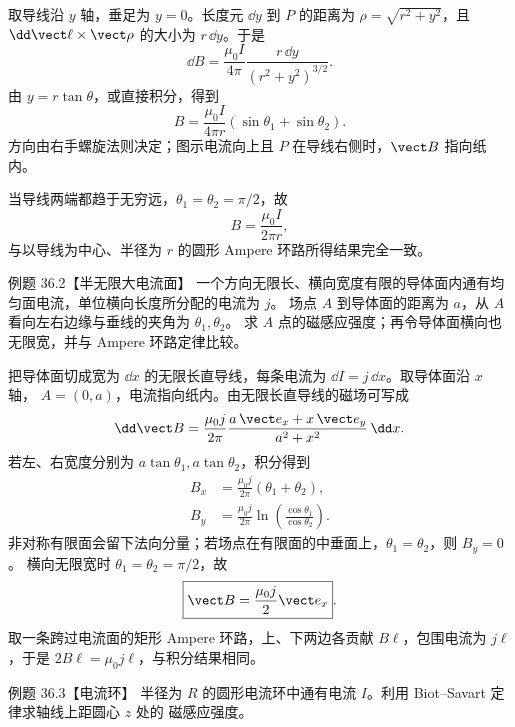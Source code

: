 \begin{xesolution}
取导线沿 $y$ 轴，垂足为 $y=0$。长度元 $\dd y$ 到 $P$ 的距离为
$\rho=\sqrt{r^2+y^2}$，且 $\dd\vect\ell\times\vect\rho$ 的大小为 $r\,\dd y$。于是
\[
  \dd B=\frac{\mu_0I}{4\pi}\frac{r\,\dd y}{(r^2+y^2)^{3/2}}.
\]
由 $y=r\tan\theta$，或直接积分，得到
\begin{equation}
  \boxed{B=\frac{\mu_0I}{4\pi r}
  (\sin\theta_1+\sin\theta_2)}.
\end{equation}
方向由右手螺旋法则决定；图示电流向上且 $P$ 在导线右侧时，$\vect B$ 指向纸内。

当导线两端都趋于无穷远，$\theta_1=\theta_2=\pi/2$，故
\[
  \boxed{B=\frac{\mu_0I}{2\pi r}},
\]
与以导线为中心、半径为 $r$ 的圆形 Ampere 环路所得结果完全一致。

\finiteWireDiagram
\end{xesolution}

\Needspace{0.18\textheight}
\begin{origexamplebox}{例题 36.2【半无限大电流面】}
一个方向无限长、横向宽度有限的导体面内通有均匀面电流，单位横向长度所分配的电流为 $j$。
场点 $A$ 到导体面的距离为 $a$，从 $A$ 看向左右边缘与垂线的夹角为 $\theta_1,\theta_2$。
求 $A$ 点的磁感应强度；再令导体面横向也无限宽，并与 Ampere 环路定律比较。
\end{origexamplebox}

\begin{xesolution}
把导体面切成宽为 $\dd x$ 的无限长直导线，每条电流为 $\dd I=j\,\dd x$。取导体面沿 $x$ 轴，
$A=(0,a)$，电流指向纸内。由无限长直导线的磁场可写成
\[
  \dd\vect B=\frac{\mu_0j}{2\pi}
  \frac{a\,\vect e_x+x\,\vect e_y}{a^2+x^2}\,\dd x.
\]
若左、右宽度分别为 $a\tan\theta_1,a\tan\theta_2$，积分得到
\begin{align}
  B_x&=\frac{\mu_0j}{2\pi}(\theta_1+\theta_2),\\
  B_y&=\frac{\mu_0j}{2\pi}
  \ln\!\left(\frac{\cos\theta_1}{\cos\theta_2}\right).
\end{align}
非对称有限面会留下法向分量；若场点在有限面的中垂面上，$\theta_1=\theta_2$，则 $B_y=0$。
横向无限宽时 $\theta_1=\theta_2=\pi/2$，故
\begin{equation}
  \boxed{\vect B=\frac{\mu_0j}{2}\vect e_x}.
\end{equation}
取一条跨过电流面的矩形 Ampere 环路，上、下两边各贡献 $B\ell$，包围电流为 $j\ell$，于是
$2B\ell=\mu_0j\ell$，与积分结果相同。

\currentSheetDiagram
\end{xesolution}

\Needspace{0.18\textheight}
\begin{origexamplebox}{例题 36.3【电流环】}
半径为 $R$ 的圆形电流环中通有电流 $I$。利用 Biot--Savart 定律求轴线上距圆心 $z$ 处的
磁感应强度。
\end{origexamplebox}

